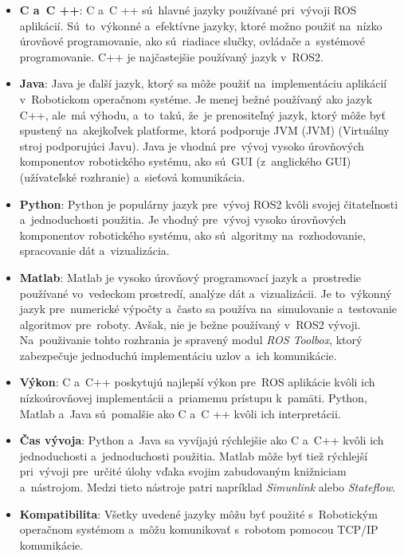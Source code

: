 \begin{itemize}
	\item \textbf{C a~C ++}: C a~C ++ sú~hlavné jazyky používané pri~vývoji ROS aplikácií. Sú~to~výkonné a~efektívne jazyky,
		ktoré možno použiť na~nízko úrovňové programovanie, ako sú~riadiace slučky, ovládače a~systémové programovanie.
		C++ je najčastejšie používaný jazyk v~ROS2.

	\item \textbf{Java}: Java je ďalší jazyk, ktorý sa môže použiť na~implementáciu aplikácií v~Robotickom operačnom
		systéme. Je menej bežné používaný ako jazyk C++, ale~má výhodu, a~to~takú, že~je prenositeľný jazyk, ktorý môže
		byť spustený na~akejkoľvek platforme, ktorá podporuje JVM (\acrlong{JVM}) (Virtuálny stroj podporujúci Javu).
		Java je vhodná pre~vývoj vysoko úrovňových komponentov robotického systému, ako sú~GUI (z~anglického \acrlong{GUI})
		(užívateľské rozhranie) a~sieťová komunikácia.

	\item \textbf{Python}: Python je populárny jazyk pre~vývoj ROS2 kvôli svojej čitateľnosti a~jednoduchosti použitia.
		Je vhodný pre~vývoj vysoko úrovňových komponentov robotického systému, ako sú~algoritmy na~rozhodovanie,
		spracovanie dát a~vizualizácia.

	\item \textbf{Matlab}: Matlab je vysoko úrovňový programovací jazyk a~prostredie používané vo~vedeckom prostredí,
		analýze dát a~vizualizácii. Je to~výkonný jazyk pre~numerické výpočty a~často sa používa na~simulovanie
		a~testovanie algoritmov pre~roboty. Avšak, nie je bežne používaný v~ROS2 vývoji. Na~použivanie tohto rozhrania
		je spravený modul \textit{ROS Toolbox}, ktorý zabezpečuje jednoduchú implementáciu uzlov a~ich komunikácie.

	\item \textbf{Výkon}: C a~C++ poskytujú najlepší výkon pre~ROS aplikácie kvôli ich nízkoúrovňovej implementácii a~priamemu
		prístupu k~pamäti. Python, Matlab a~Java sú~pomalšie ako C a~C ++ kvôli ich interpretácii.

	\item \textbf{Čas vývoja}: Python a~Java sa vyvíjajú rýchlejšie ako C a~C++ kvôli ich jednoduchosti a~jednoduchosti
		použitia. Matlab môže byť tiež rýchlejší pri~vývoji pre~určité úlohy vďaka svojim zabudovaným knižniciam a~nástrojom.
		Medzi tieto nástroje patri napríklad \textit{Simunlink} alebo \textit{Stateflow}.

	\item \textbf{Kompatibilita}: Všetky uvedené jazyky môžu byť použité s~Robotickým operačnom systémom a~môžu
		komunikovať s~robotom pomocou TCP/IP komunikácie.
\end{itemize}

